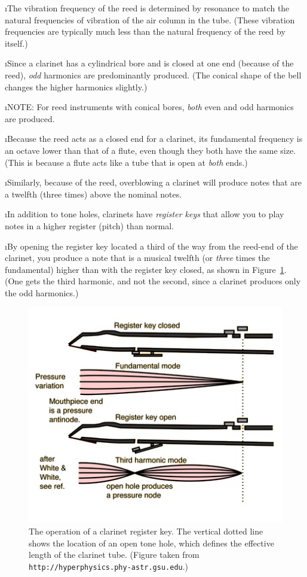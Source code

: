 \i The vibration frequency of the reed is determined
by resonance to match the natural frequencies
of vibration of the air column in the tube.
(These vibration frequencies are typically much less than 
the natural frequency of the reed by itself.)

\i Since a clarinet has a cylindrical bore and is closed
at one end (because of the reed), {\em odd} harmonics are
predominantly produced.
(The conical shape of the bell changes the higher harmonics 
slightly.)

\i NOTE:
For reed instruments with conical bores, {\em both} even 
and odd harmonics are produced.

\i Because the reed acts as a closed end for a clarinet,
its fundamental frequency is an octave lower than that of 
a flute, even though they both have the same size.
(This is because a flute acts like a tube that is open at 
{\em both} ends.)

\i Similarly, because of the reed, overblowing a clarinet 
will produce notes that are a twelfth (three times) above 
the nominal notes.

\i In addition to tone holes, clarinets have 
{\em register keys} that allow you to
play notes in a higher register (pitch) than normal.

\i By opening the register key located a third of the way
from the reed-end of the clarinet, you produce a note
that is a musical twelfth 
(or {\em three} times the fundamental) 
higher than with the register key closed, as shown in
Figure~\ref{f:registerkey}.
(One gets the third harmonic, and not the second, since a 
clarinet produces only the odd harmonics.)
%
\begin{figure}[htbp]
\begin{center}
\includegraphics[width=.9\textwidth]{registerkey.jpg}
\caption{The operation of a clarinet register key.
The vertical dotted line shows the location of an open
tone hole, which defines the effective length of the
clarinet tube.
(Figure taken from 
{\tt http://hyperphysics.phy-astr.gsu.edu}.)}
\label{f:registerkey}
\end{center}
\end{figure}

